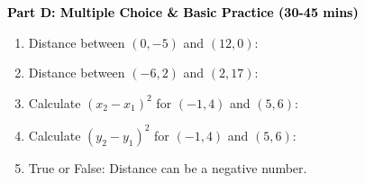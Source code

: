 \documentclass[12pt, letterpaper, fleqn]{article}
\newcommand{\blank}{\underline{\hspace{2.2cm}}}
\begin{document}
\newpage

\begin{tcolorbox}[colback=customteal!20]
\large\textcolor{black}{\textbf{Part D: Multiple Choice \& Basic Practice (30-45 mins)}}
\end{tcolorbox}

\vspace{3mm}

\begin{enumerate}[itemsep=2.5cm, leftmargin=0.6cm, resume]
\item Distance between $(0,-5)$ and $(12,0)$: \blank
\item Distance between $(-6,2)$ and $(2,17)$: \blank
\item Calculate $(x_2 - x_1)^2$ for $(-1, 4)$ and $(5, 6)$: \blank
\item Calculate $(y_2 - y_1)^2$ for $(-1, 4)$ and $(5, 6)$: \blank
\item True or False: Distance can be a negative number. \blank
\end{enumerate}
\end{document}
